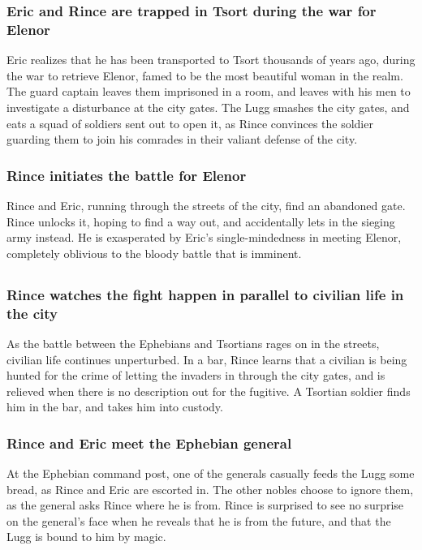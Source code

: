 \subsubsection{\Gls{Eric} and \Gls{Rince} are trapped in Tsort during the war for \Gls{Elenor}}
\Gls{Eric} realizes that he has been transported to Tsort thousands of years ago, during the war
to retrieve \Gls{Elenor}, famed to be the most beautiful woman in the realm. The guard captain
leaves them imprisoned in a room, and leaves with his men to investigate a disturbance at the city
gates. The \Gls{Lugg} smashes the city gates, and eats a squad of soldiers sent out to open it,
as \Gls{Rince} convinces the soldier guarding them to join his comrades in their valiant defense of
the city.

\subsubsection{\Gls{Rince} initiates the battle for \Gls{Elenor}}
\Gls{Rince} and \Gls{Eric}, running through the streets of the city, find an abandoned gate.
\Gls{Rince} unlocks it, hoping to find a way out, and accidentally lets in the sieging army instead.
He is exasperated by \Gls{Eric}'s single-mindedness in meeting \Gls{Elenor}, completely oblivious
to the bloody battle that is imminent.

\subsection{}
\subsubsection{\Gls{Rince} watches the fight happen in parallel to civilian life in the city}
As the battle between the Ephebians and Tsortians rages on in the streets, civilian life continues
unperturbed. In a bar, \Gls{Rince} learns that a civilian is being hunted for the crime of letting
the invaders in through the city gates, and is relieved when there is no description out for the
fugitive. A Tsortian soldier finds him in the bar, and takes him into custody.

\subsubsection{\Gls{Rince} and \Gls{Eric} meet the Ephebian general}
At the Ephebian command post, one of the generals casually feeds the \Gls{Lugg} some bread, as
\Gls{Rince} and \Gls{Eric} are escorted in. The other nobles choose to ignore them, as the general
asks \Gls{Rince} where he is from. \Gls{Rince} is surprised to see no surprise on the general's face
when he reveals that he is from the future, and that the \Gls{Lugg} is bound to him by magic.

